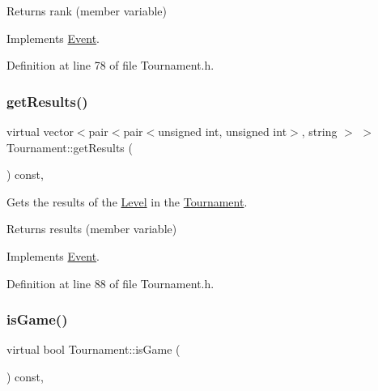 \begin{DoxyReturn}{Returns}
rank (member variable) 
\end{DoxyReturn}


Implements \hyperlink{class_event_ab267b8e94c78ca51636792d75101acb5}{Event}.



Definition at line 78 of file Tournament.\+h.

\hypertarget{class_tournament_abacd2d5489099f31a9688a7da4d64c40}{}\label{class_tournament_abacd2d5489099f31a9688a7da4d64c40} 
\subsubsection{\texorpdfstring{get\+Results()}{getResults()}}
{\footnotesize\ttfamily virtual vector$<$pair$<$pair$<$unsigned int, unsigned int$>$, string $>$ $>$ Tournament\+::get\+Results (\begin{DoxyParamCaption}{ }\end{DoxyParamCaption}) const\hspace{0.3cm}{\ttfamily [inline]}, {\ttfamily [virtual]}}



Gets the results of the \hyperlink{class_level}{Level} in the \hyperlink{class_tournament}{Tournament}. 

\begin{DoxyReturn}{Returns}
results (member variable) 
\end{DoxyReturn}


Implements \hyperlink{class_event_a9d29f8c725da32b5fbf70ccf7961f02b}{Event}.



Definition at line 88 of file Tournament.\+h.

\hypertarget{class_tournament_a62adb322a6d5268d4ec3e267570ff4ed}{}\label{class_tournament_a62adb322a6d5268d4ec3e267570ff4ed} 
\subsubsection{\texorpdfstring{is\+Game()}{isGame()}}
{\footnotesize\ttfamily virtual bool Tournament\+::is\+Game (\begin{DoxyParamCaption}{ }\end{DoxyParamCaption}) const\hspace{0.3cm}{\ttfamily [inline]}, {\ttfamily [virtual]}}



